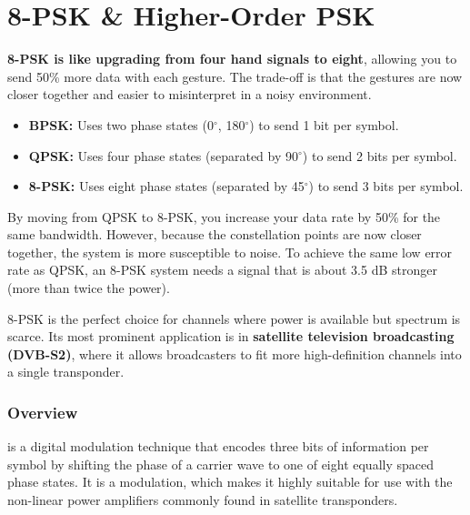 
\chapter{8-PSK \& Higher-Order PSK}
\label{ch:8psk}

\begin{nontechnical}
    \textbf{8-PSK is like upgrading from four hand signals to eight}, allowing you to send 50\% more data with each gesture. The trade-off is that the gestures are now closer together and easier to misinterpret in a noisy environment.

    \begin{itemize}
        \item \textbf{BPSK:} Uses two phase states (0$^\circ$, 180$^\circ$) to send 1 bit per symbol.
        \item \textbf{QPSK:} Uses four phase states (separated by 90$^\circ$) to send 2 bits per symbol.
        \item \textbf{8-PSK:} Uses eight phase states (separated by 45$^\circ$) to send 3 bits per symbol.
    \end{itemize}

     By moving from QPSK to 8-PSK, you increase your data rate by 50\% for the same bandwidth. However, because the constellation points are now closer together, the system is more susceptible to noise. To achieve the same low error rate as QPSK, an 8-PSK system needs a signal that is about 3.5 dB stronger (more than twice the power).

     8-PSK is the perfect choice for  channels where power is available but spectrum is scarce. Its most prominent application is in \textbf{satellite television broadcasting (DVB-S2)}, where it allows broadcasters to fit more high-definition channels into a single transponder.
\end{nontechnical}


\subsection{Overview}

 is a digital modulation technique that encodes three bits of information per symbol by shifting the phase of a carrier wave to one of eight equally spaced phase states. It is a  modulation, which makes it highly suitable for use with the non-linear power amplifiers commonly found in satellite transponders.

